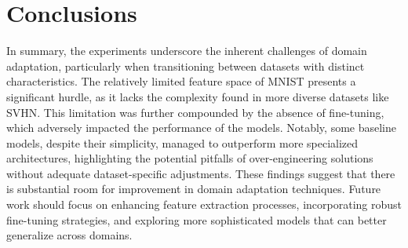 \documentclass[conference]{IEEEtran}
\begin{document}
\section{Conclusions}
In summary, the experiments underscore the inherent challenges of domain adaptation, particularly when transitioning between datasets with distinct characteristics. The relatively limited feature space of MNIST presents a significant hurdle, as it lacks the complexity found in more diverse datasets like SVHN. This limitation was further compounded by the absence of fine-tuning, which adversely impacted the performance of the models. Notably, some baseline models, despite their simplicity, managed to outperform more specialized architectures, highlighting the potential pitfalls of over-engineering solutions without adequate dataset-specific adjustments. These findings suggest that there is substantial room for improvement in domain adaptation techniques. Future work should focus on enhancing feature extraction processes, incorporating robust fine-tuning strategies, and exploring more sophisticated models that can better generalize across domains.
\end{document}
